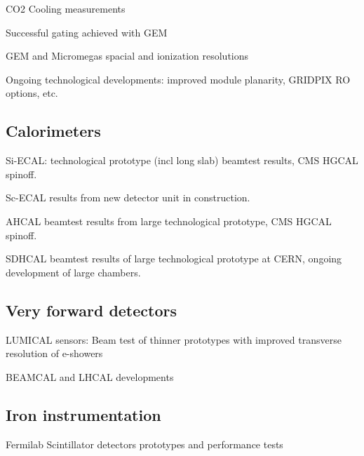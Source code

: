 CO2 Cooling measurements            

Successful gating achieved with GEM

GEM and Micromegas spacial and ionization resolutions

Ongoing technological developments: improved module planarity, GRIDPIX RO options, etc.  

\vspace{2cm}
\subsection{Calorimeters}

Si-ECAL: technological prototype (incl long slab) beamtest results, CMS HGCAL spinoff.

Sc-ECAL results from new detector unit in construction.

AHCAL beamtest results from large technological prototype, CMS HGCAL spinoff.

SDHCAL beamtest results of large technological prototype at CERN, ongoing development of large chambers. 

\vspace{2cm}
\subsection{Very forward detectors}

LUMICAL sensors: Beam test of thinner prototypes with improved transverse resolution of e-showers

BEAMCAL and LHCAL developments

\vspace{4cm}
\subsection{Iron instrumentation}

Fermilab Scintillator detectors prototypes and performance tests

\vspace{2cm}